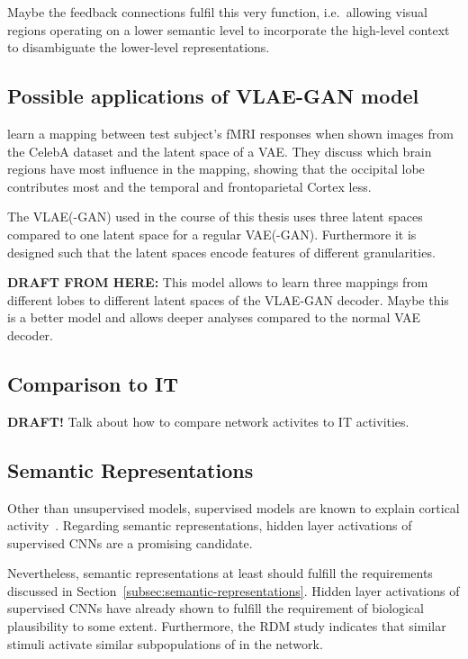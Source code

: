 Maybe the feedback connections fulfil this very function, i.e.\ allowing visual regions operating on a lower semantic level to incorporate the high-level context to disambiguate the lower-level representations.

\subsection{Possible applications of VLAE-GAN model}\label{subsec:possible-applications-of-vlae-gan-model}
\citet{vanrullen2019reconstructing} learn a mapping between test subject's fMRI responses when shown images from the CelebA dataset and the latent space of a \ac{VAE}.
They discuss which brain regions have most influence in the mapping, showing that the occipital lobe contributes most and the temporal and frontoparietal Cortex less.

The \ac{VLAE}(-\ac{GAN}) used in the course of this thesis uses three latent spaces compared to one latent space for a regular \ac{VAE}(-\ac{GAN}).
Furthermore it is designed such that the latent spaces encode features of different granularities.

\textbf{DRAFT FROM HERE:}
This model allows to learn three mappings from different lobes to different latent spaces of the VLAE-GAN decoder.
Maybe this is a better model and allows deeper analyses compared to the normal VAE decoder.

\subsection{Comparison to \ac{IT}}
\textbf{DRAFT!}
Talk about how to compare network activites to IT activities.

\subsection{Semantic Representations}\label{subsec:semantic-representations-results}
Other than unsupervised models, supervised models are known to explain cortical activity~\citep{khaligh2014deep,cadieu2014deep}.
Regarding semantic representations, hidden layer activations of supervised \acp{CNN} are a promising candidate.

Nevertheless, semantic representations at least should fulfill the requirements discussed in Section~\ref{subsec:semantic-representations}.
Hidden layer activations of supervised \acp{CNN} have already shown to fulfill the requirement of biological plausibility to some extent.
Furthermore, the \ac{RDM} study indicates that similar stimuli activate similar subpopulations of  in the network.

